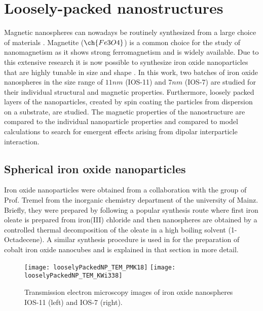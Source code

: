 \documentclass[\main/dresen_thesis.tex]{subfiles}
\begin{document}
\chapter{Loosely-packed nanostructures}\label{ch:looselyPackedNS}
Magnetic nanospheres can nowadays be routinely synthesized from a large choice of materials \cite{Gubin_2005_Magne}.
Magnetite ($\ch{Fe3O4}$) is a common choice for the study of nanomagnetism as it shows strong ferromagnetism and is widely available.
Due to this extensive research it is now possible to synthesize iron oxide nanoparticles that are highly tunable in size and shape \cite{Wetterskog_2014_Preci}.
In this work, two batches of iron oxide nanospheres in the size range of $11 \unit{nm}$ (IOS-11) and $7 \unit{nm}$ (IOS-7) are studied for their individual structural and magnetic properties.
Furthermore, loosely packed layers of the nanoparticles, created by spin coating the particles from dispersion on a substrate, are studied.
The magnetic properties of the nanostructure are compared to the individual nanoparticle properties and compared to model calculations to search for emergent effects arising from dipolar interparticle interaction.

\section{Spherical iron oxide nanoparticles}
Iron oxide nanoparticles were obtained from a collaboration with the group of Prof. Tremel from the inorganic chemistry department of the university of Mainz.
Briefly, they were prepared by following a popular synthesis route where first iron oleate is prepared from iron(III) chloride and then nanospheres are obtained by a controlled thermal decomposition of the oleate in a high boiling solvent (1-Octadecene).
A similar synthesis procedure is used in  for the preparation of cobalt iron oxide nanocubes and is explained in that section in more detail.

\begin{figure}[tb]
  \centering
  \texttt{[image: looselyPackedNP\_TEM\_PMK18]}
  \texttt{[image: looselyPackedNP\_TEM\_KWi338]}
  \caption{\label{fig:looselyPackedNP:nanoparticle:tem}Transmission electron microscopy images of iron oxide nanospheres IOS-11 (left) and IOS-7 (right).}
\end{figure}
\end{document}
